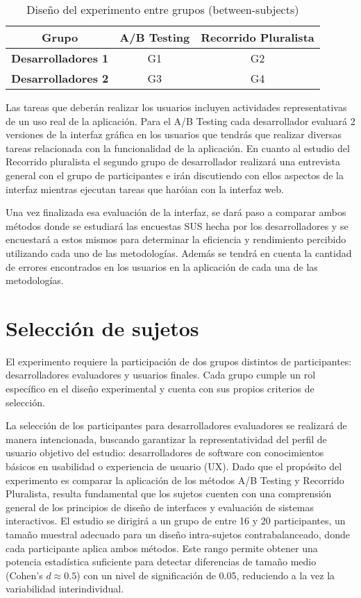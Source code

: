 \documentclass[a4paper,12pt]{report}
\begin{document}
\begin{table}[h]
\centering
\begin{tabular}{|c|c|c|}
\hline
\textbf{Grupo} & \textbf{A/B Testing} & \textbf{Recorrido Pluralista} \\ \hline
\textbf{Desarrolladores 1} & G1 & G2 \\ \hline
\textbf{Desarrolladores 2} & G3 & G4 \\ \hline
\end{tabular}
\caption{Diseño del experimento entre grupos (between-subjects)}
\label{tab:diseño_experimento}
\end{table}

Las tareas que deberán realizar los usuarios incluyen actividades representativas de un uso real de la aplicación. Para el A/B Testing cada desarrollador evaluará 2 versiones de la interfaz gráfica en los usuarios que tendrás que realizar diversas tareas relacionada con la funcionalidad de la aplicación. En cuanto al estudio del Recorrido pluralista el segundo grupo de desarrollador realizará una entrevista general con el grupo de participantes e irán discutiendo con ellos aspectos de la interfaz mientras ejecutan tareas que haróian con la interfaz web.


Una vez finalizada esa evaluación de la interfaz, se dará paso a comparar ambos métodos donde se estudiará las encuestas SUS hecha por los desarrolladores y se encuestará a estos mismos para determinar la eficiencia y rendimiento percibido utilizando cada uno de las metodologías. Además se tendrá en cuenta la cantidad de errores encontrados en los usuarios en la aplicación de cada una de las metodologías.

\section{Selección de sujetos}
El experimento requiere la participación de dos grupos distintos de participantes: desarrolladores evaluadores y usuarios finales. Cada grupo cumple un rol específico en el diseño experimental y cuenta con sus propios criterios de selección.

La selección de los participantes para desarrolladores evaluadores se realizará de manera intencionada, buscando garantizar la representatividad del perfil de usuario objetivo del estudio: desarrolladores de software con conocimientos básicos en usabilidad o experiencia de usuario (UX). Dado que el propósito del experimento es comparar la aplicación de los métodos A/B Testing y Recorrido Pluralista, resulta fundamental que los sujetos cuenten con una comprensión general de los principios de diseño de interfaces y evaluación de sistemas interactivos.
El estudio se dirigirá a un grupo de entre 16 y 20 participantes, un tamaño muestral adecuado para un diseño intra-sujetos contrabalanceado, donde cada participante aplica ambos métodos. Este rango permite obtener una potencia estadística suficiente para detectar diferencias de tamaño medio (Cohen's $d \approx 0.5$) con un nivel de significación de 0.05, reduciendo a la vez la variabilidad interindividual.
\end{document}
